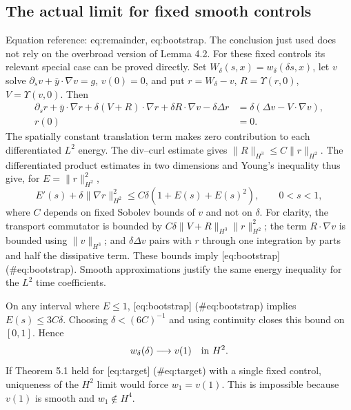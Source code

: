 \documentclass[10pt]{article}
\begin{document}
\subsection*{The actual limit for fixed smooth controls}
Equation reference: eq:remainder, eq:bootstrap. The conclusion just used does not rely on the overbroad version of Lemma 4.2. For these fixed controls its relevant special case can be proved directly. Set \(W_\delta(s,x)=w_\delta(\delta s,x)\), let \(v\) solve \(\partial_sv+\bar y\cdot\nabla v=g\), \(v(0)=0\), and put \(r=W_\delta-v\), \(R=\Upsilon(r,0)\), \(V=\Upsilon(v,0)\). Then \[\begin{split}
 \partial_s r+\bar y\cdot\nabla r
 +\delta(V+R)\cdot\nabla r+\delta R\cdot\nabla v
 -\delta\Delta r
 &=\delta(\Delta v-V\cdot\nabla v),\\
 r(0)&=0 .
 \end{split}                                               \] The spatially constant translation term makes zero contribution to each differentiated \(L^2\) energy. The div–curl estimate gives \(\|R\|_{H^3}\le C\|r\|_{H^2}\). The differentiated product estimates in two dimensions and Young’s inequality thus give, for \(E=\|r\|_{H^2}^2\), \[E'(s)+\delta\|\nabla r\|_{H^2}^2
 \le C\delta(1+E(s)+E(s)^2),\qquad 0<s<1,                    \] where \(C\) depends on fixed Sobolev bounds of \(v\) and not on \(\delta\). For clarity, the transport commutator is bounded by \(C\delta\|V+R\|_{H^3}\|r\|_{H^2}^2\); the term \(R\cdot\nabla v\) is bounded using \(\|v\|_{H^3}\); and \(\delta\Delta v\) pairs with \(r\) through one integration by parts and half the dissipative term. These bounds imply [eq:bootstrap] (\#eq:bootstrap). Smooth approximations justify the same energy inequality for the \(L^2\) time coefficients.\par
On any interval where \(E\le1\), [eq:bootstrap] (\#eq:bootstrap) implies \(E(s)\le3C\delta\). Choosing \(\delta<(6C)^{-1}\) and using continuity closes this bound on \([0,1]\). Hence \[w_\delta(\delta)\longrightarrow v(1)\quad\hbox{in }H^2.\] If Theorem 5.1 held for [eq:target] (\#eq:target) with a single fixed control, uniqueness of the \(H^2\) limit would force \(w_1=v(1)\). This is impossible because \(v(1)\) is smooth and \(w_1\notin H^4\).\par
\end{document}
